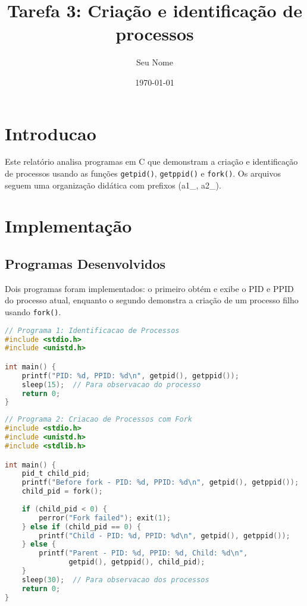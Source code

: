 \documentclass[10pt]{article}
\title{Tarefa 3: Criação e identificação de processos}
\author{Seu Nome}
\date{\today}
\begin{document}
\maketitle
\thispagestyle{empty}

\section{Introducao}

Este relatório analisa programas em C que demonstram a criação e identificação de processos usando as funções \texttt{getpid()}, \texttt{getppid()} e \texttt{fork()}. Os arquivos seguem uma organização didática com prefixos (a1\_, a2\_).

\section{Implementação}

\subsection{Programas Desenvolvidos}

Dois programas foram implementados: o primeiro obtém e exibe o PID e PPID do processo atual, enquanto o segundo demonstra a criação de um processo filho usando \texttt{fork()}.

\begin{lstlisting}[language=C, caption=a1\_process\_id.c]
// Programa 1: Identificacao de Processos
#include <stdio.h>
#include <unistd.h>

int main() {
    printf("PID: %d, PPID: %d\n", getpid(), getppid());
    sleep(15);  // Para observacao do processo
    return 0;
}
\end{lstlisting}

\begin{lstlisting}[language=C, caption=a2\_fork\_process.c]
// Programa 2: Criacao de Processos com Fork
#include <stdio.h>
#include <unistd.h>
#include <stdlib.h>

int main() {
    pid_t child_pid;
    printf("Before fork - PID: %d, PPID: %d\n", getpid(), getppid());
    child_pid = fork();
    
    if (child_pid < 0) {
        perror("Fork failed"); exit(1);
    } else if (child_pid == 0) {
        printf("Child - PID: %d, PPID: %d\n", getpid(), getppid());
    } else {
        printf("Parent - PID: %d, PPID: %d, Child: %d\n", 
               getpid(), getppid(), child_pid);
    }
    sleep(30);  // Para observacao dos processos
    return 0;
}
\end{lstlisting}
\end{document}
